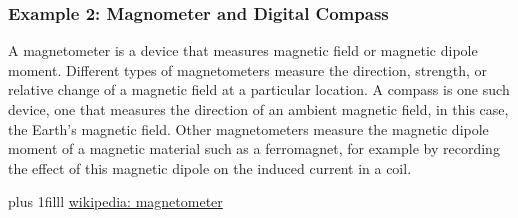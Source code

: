 \documentclass[fleqn]{beamer} %
\newcommand{\sectionIIsubsectionIVtitle}{Example 2: Magnometer and Digital Compass}
\newcommand{\btVFill}{\vskip0pt plus 1filll}
\begin{document}
			\begin{frame}
				\frametitle{\sectionIIsubsectionIVtitle}

				A magnetometer is a device that measures magnetic field or magnetic dipole moment. Different types of magnetometers measure the direction, strength, or relative change of a magnetic field at a particular location. A compass is one such device, one that measures the direction of an ambient magnetic field, in this case, the Earth's magnetic field. Other magnetometers measure the magnetic dipole moment of a magnetic material such as a ferromagnet, for example by recording the effect of this magnetic dipole on the induced current in a coil. 


				\btVFill	
				{\tiny \href{https://en.wikipedia.org/wiki/Magnetometer}{wikipedia: magnetometer} }

			\end{frame}
		
	
\end{document}
